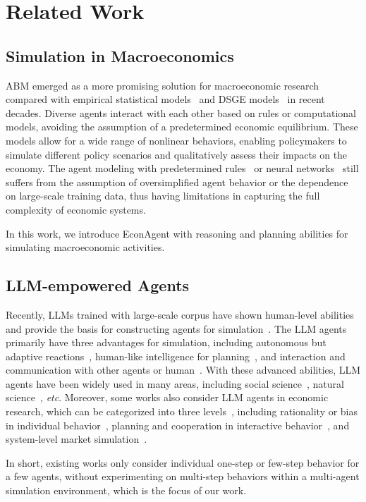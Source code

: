 \section{Related Work}
\label{sec::related}

\subsection{Simulation in Macroeconomics}\label{sec::relatedwork1}

ABM emerged as a more promising solution for macroeconomic research compared with empirical statistical models~\cite{hendry1982formulation,phelps1967phillips,kydland1982time} and DSGE models~\cite{christiano2005nominal} in recent decades.
Diverse agents interact with each other based on rules or computational models, avoiding the assumption of a predetermined economic equilibrium. These models allow for a wide range of nonlinear behaviors, enabling policymakers to simulate different policy scenarios and qualitatively assess their impacts on the economy.
The agent modeling with predetermined rules~\cite{tesfatsion2006handbook,brock1998heterogeneous} or neural networks~\cite{trott2021building,zheng2022ai,mi2023taxai} still suffers from the assumption of oversimplified agent behavior or the dependence on large-scale training data, thus having limitations in capturing the full complexity of economic systems.

In this work, we introduce EconAgent with reasoning and planning abilities for simulating macroeconomic activities.



\subsection{LLM-empowered Agents}\label{sec::relatedwork1}
Recently, LLMs trained with large-scale corpus have shown human-level abilities and provide the basis for constructing agents for simulation~\cite{wang2023survey,xi2023rise}.
The LLM agents primarily have three advantages for simulation, including autonomous but adaptive reactions~\cite{autogpt, babyagi}, human-like intelligence for planning~\cite{wang2023survey,xi2023rise}, and interaction and communication with other agents or human~\cite{park2023generative,gilbert2005simulation,park2023generative}. With these advanced abilities, LLM agents have been widely used in many areas, including social science~\cite{park2022social,park2023generative,kovavc2023socialai,gao2023s,jinxin2023cgmi}, natural science~\cite{boiko2023emergent,bran2023chemcrow}, \textit{etc}. Moreover, some works also consider LLM agents in economic research, which can be categorized into three levels~\cite{gao2023large}, including rationality or bias in individual behavior~\cite{horton2023large,chen2023emergence}, planning and cooperation in interactive behavior~\cite{guo2023gpt,akata2023playing}, and system-level market simulation~\cite{zhao2023competeai,anonymous2024rethinking,chen2023put}. 

In short, existing works only consider individual one-step or few-step behavior for a few agents, without experimenting on multi-step behaviors within a multi-agent simulation environment, which is the focus of our work.

